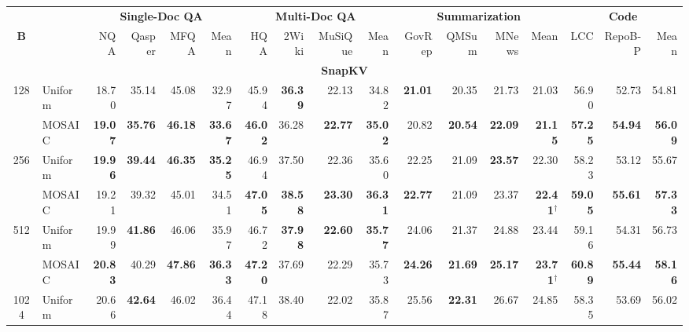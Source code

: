 \begin{table}[tp]
  \centering
  \scriptsize
  \setlength{\tabcolsep}{3pt}
  \renewcommand{\arraystretch}{0.92}
  \begin{tabular}{@{} c l rrrr rrrr rrrr rrr @{}}
    \toprule
    & & \multicolumn{4}{c}{\textbf{Single-Doc QA}} & \multicolumn{4}{c}{\textbf{Multi-Doc QA}} & \multicolumn{4}{c}{\textbf{Summarization}} & \multicolumn{3}{c}{\textbf{Code}} \\
    \cmidrule(lr){3-6} \cmidrule(lr){7-10} \cmidrule(lr){11-14} \cmidrule(lr){15-17}
    \textbf{B} & & NQA & Qasper & MFQA & Mean & HQA & 2Wiki & MuSiQue & Mean & GovRep & QMSum & MNews & Mean & LCC & RepoB-P & Mean \\
    \midrule
    \multicolumn{17}{c}{\textbf{SnapKV}} \\
    \midrule
    \multirow{2}{*}{128} & Uniform & 18.70 & 35.14 & 45.08 & 32.97 & 45.94 & \textbf{36.39} & 22.13 & 34.82 & \textbf{21.01} & 20.35 & 21.73 & 21.03 & 56.90 & 52.73 & 54.81 \\
     & MOSAIC & \textbf{19.07} & \textbf{35.76} & \textbf{46.18} & \textbf{33.67} & \textbf{46.02} & 36.28 & \textbf{22.77} & \textbf{35.02} & 20.82 & \textbf{20.54} & \textbf{22.09} & \textbf{21.15} & \textbf{57.25} & \textbf{54.94} & \textbf{56.09} \\
    \cmidrule(l){1-17}
    \multirow{2}{*}{256} & Uniform & \textbf{19.96} & \textbf{39.44} & \textbf{46.35} & \textbf{35.25} & 46.94 & 37.50 & 22.36 & 35.60 & 22.25 & 21.09 & \textbf{23.57} & 22.30 & 58.23 & 53.12 & 55.67 \\
     & MOSAIC & 19.21 & 39.32 & 45.01 & 34.51 & \textbf{47.05} & \textbf{38.58} & \textbf{23.30} & \textbf{36.31} & \textbf{22.77} & 21.09 & 23.37 & \textbf{22.41}$^\dagger$ & \textbf{59.05} & \textbf{55.61} & \textbf{57.33} \\
    \cmidrule(l){1-17}
    \multirow{2}{*}{512} & Uniform & 19.99 & \textbf{41.86} & 46.06 & 35.97 & 46.72 & \textbf{37.98} & \textbf{22.60} & \textbf{35.77} & 24.06 & 21.37 & 24.88 & 23.44 & 59.16 & 54.31 & 56.73 \\
     & MOSAIC & \textbf{20.83} & 40.29 & \textbf{47.86} & \textbf{36.33} & \textbf{47.20} & 37.69 & 22.29 & 35.73 & \textbf{24.26} & \textbf{21.69} & \textbf{25.17} & \textbf{23.71}$^\dagger$ & \textbf{60.89} & \textbf{55.44} & \textbf{58.16} \\
    \cmidrule(l){1-17}
    \multirow{2}{*}{1024} & Uniform & 20.66 & \textbf{42.64} & 46.02 & 36.44 & 47.18 & 38.40 & 22.02 & 35.87 & 25.56 & \textbf{22.31} & 26.67 & 24.85 & 58.35 & 53.69 & 56.02 \\

\end{tabular}
\end{table}
